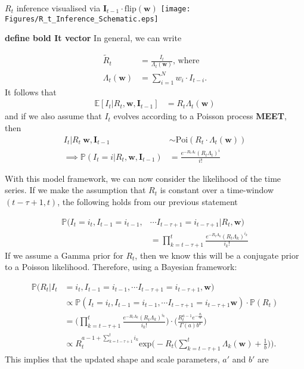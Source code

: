\documentclass[10pt,journal,compsoc]{IEEEtran}
\begin{document}
\begin{minipage}{0.95\linewidth}
\centering
$R_t$ inference visualised via $\boldsymbol{I}_{t-1} \cdot \mathrm{flip}(\boldsymbol{w})$
\texttt{[image: Figures/R\_t\_Inference\_Schematic.eps]}
\label{fig:R_t_Inference_Schematic}
\end{minipage} 
\textbf{define bold It vector}
In general, we can write

\begin{align*}
\tilde{R}_t &= \frac{I_t}{\Lambda_t(\boldsymbol{w})} \text{, where}\\
\Lambda_t(\boldsymbol{w}) &= \sum_{i=1}^N w_i \cdot I_{t-i}.
\end{align*}
It follows that
\begin{align*}
\mathbb{E}[I_t |R_t, \boldsymbol{w}, \boldsymbol{I}_{t-1}] &= R_t \Lambda_t(\boldsymbol{w})
\end{align*}
and if we also assume that $I_t$ evolves according to a Poisson process \textbf{MEET}, then
\begin{align*}
 I_t|R_t\ \boldsymbol{w}, \boldsymbol{I}_{t-1} &\sim \mathrm{Poi}(R_t \cdot \Lambda_t(\boldsymbol{w}))\\
\implies \mathbb{P}(I_t = i | R_t, \boldsymbol{w}, \boldsymbol{I}_{t-1}) &= \frac{e^{-R_t\Lambda_t}(R_t\Lambda_t)^i}{i!}
\end{align*}

With this model framework, we can now consider the likelihood of the time series. If we make the assumption that $R_t$ is constant over a time-window $(t-\tau +1, t)$, the following holds from our previous statement

\begin{align*}
\mathbb{P}(I_t=i_t, I_{t-1}=i_{t-1}, &\cdots I_{t-\tau +1} = i_{t-\tau +1}|R_t, \boldsymbol{w})\\ 
&= \prod_{k=t-\tau+1}^t \frac{e^{-R_t \Lambda_k}(R_t \Lambda_k)^{i_k}}{i_k!}
\end{align*} 
If we assume a $\mathrm{Gamma}$ prior for $R_t$, then we know this will be a conjugate prior to a Poisson likelihood. Therefore, using a Bayesian framework:

\begin{align*}
\mathbb{P}(R_t|I_t&=i_t, I_{t-1}=i_{t-1}, \cdots I_{t-\tau +1} = i_{t-\tau +1}, \boldsymbol{w})\\ 
&\propto \mathbb{P}(I_t=i_t, I_{t-1}=i_{t-1}, \cdots I_{t-\tau +1} = i_{t-\tau +1} \boldsymbol{w}) \cdot \mathbb{P}(R_t)\\
&= \Bigg( \prod_{k=t-\tau+1}^t\frac{e^{-R_t \Lambda_k}(R_t \Lambda_k)^{i_k}}{i_k!} \Bigg) \cdot \Bigg(\frac{R_t^{a-1}e^{-\frac{R_t}{b}}}{\Gamma(a)b^a} \Bigg) \\
&\propto R_t^{a-1+\sum_{k=t-\tau+1}^t i_k}\mathrm{exp}\Big( -R_t \Big( \sum_{k=t-\tau+1}^t \Lambda_k(\boldsymbol{w})+\frac{1}{b}\Big)\Big).
\end{align*}
This implies that the updated shape and scale parameters, $a'$ and $b'$ are
\end{document}
